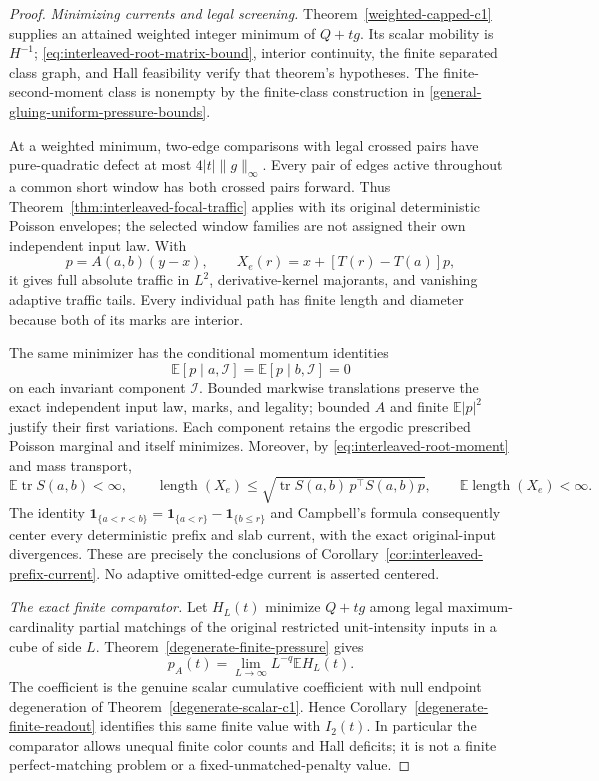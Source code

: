 \documentclass[11pt,reqno]{amsart}
\theoremstyle{definition}
\theoremstyle{remark}
\numberwithin{equation}{section}
\newcommand{\E}{\mathbb E}
\begin{document}
\begin{proof}
\emph{Minimizing currents and legal screening.}
Theorem~\ref{weighted-capped-c1} supplies an attained weighted
integer minimum of \(Q+tg\). Its scalar mobility is \(H^{-1}\);
\eqref{eq:interleaved-root-matrix-bound}, interior continuity, the
finite separated class graph, and Hall feasibility verify that
theorem's hypotheses. The finite-second-moment class is nonempty
by the finite-class construction in
\eqref{general-gluing-uniform-pressure-bounds}.

At a weighted minimum, two-edge comparisons with legal crossed
pairs have pure-quadratic defect at most \(4|t|\|g\|_\infty\).
Every pair of edges active throughout a common short window has
both crossed pairs forward. Thus
Theorem~\ref{thm:interleaved-focal-traffic} applies with its original
deterministic Poisson envelopes; the selected window families are
not assigned their own independent input law. With
\[
 p=A(a,b)(y-x),\qquad
 X_e(r)=x+[T(r)-T(a)]p,
\]
it gives full absolute traffic in \(L^2\), derivative-kernel
majorants, and vanishing adaptive traffic tails. Every individual
path has finite length and diameter because both of its marks are
interior.

The same minimizer has the conditional momentum identities
\[
 \E[p\mid a,\mathcal I]=\E[p\mid b,\mathcal I]=0
\]
on each invariant component \(\mathcal I\). Bounded markwise
translations preserve the exact independent input law, marks, and
legality; bounded \(A\) and finite \(\E|p|^2\) justify their
first variations. Each component retains the ergodic prescribed
Poisson marginal and itself minimizes.
Moreover, by \eqref{eq:interleaved-root-moment} and mass transport,
\[
 \E\operatorname{tr}S(a,b)<\infty,\qquad
 \operatorname{length}(X_e)
 \le\sqrt{\operatorname{tr}S(a,b)\,p^\top S(a,b)p},
 \qquad \E\operatorname{length}(X_e)<\infty.
\]
The identity
\(\mathbf1_{\{a<r<b\}}=\mathbf1_{\{a<r\}}-
\mathbf1_{\{b\le r\}}\) and Campbell's formula consequently
center every deterministic prefix and slab current, with the exact
original-input divergences. These are precisely the conclusions of
Corollary~\ref{cor:interleaved-prefix-current}. No adaptive
omitted-edge current is asserted centered.

\emph{The exact finite comparator.}
Let \(H_L(t)\) minimize \(Q+tg\) among legal maximum-cardinality
partial matchings of the original restricted unit-intensity inputs
in a cube of side \(L\). Theorem~\ref{degenerate-finite-pressure}
gives
\[
 p_A(t)=\lim_{L\to\infty}L^{-q}\E H_L(t).
\]
The coefficient is the genuine scalar cumulative coefficient with
null endpoint degeneration of Theorem~\ref{degenerate-scalar-c1}.
Hence Corollary~\ref{degenerate-finite-readout} identifies this
same finite value with \(I_2(t)\). In particular the comparator
allows unequal finite color counts and Hall deficits; it is not a
finite perfect-matching problem or a fixed-unmatched-penalty value.


\end{proof}
\end{document}
